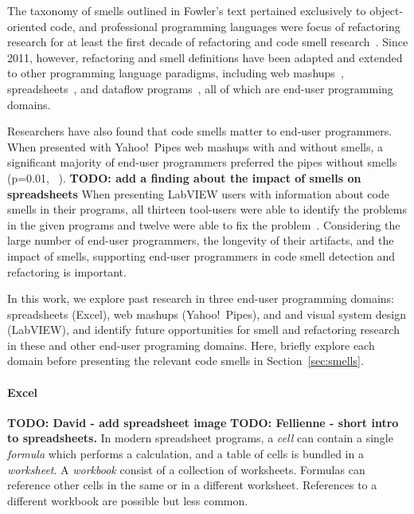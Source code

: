 \documentclass[10pt,conference,compsocconf]{IEEEtran}
\newcommand{\todo}[1]{\textbf{TODO: #1}}
\begin{document}
The taxonomy of smells outlined in Fowler's text pertained exclusively to object-oriented code, and professional programming languages were focus of refactoring research for at least the first decade of refactoring and code smell research~\cite{Mens:2004:SSR:972215.972286}.  Since 2011, however, refactoring and smell definitions have been adapted and extended to other 
programming language paradigms, including web mashups~\cite{Stolee2011, StoleeTSE2013}, spreadsheets~\cite{Hermans2011, Hermans2012inter, hermans2014bumblebee}, and dataflow programs~\cite{chambers2013smell}, all of which are  end-user programming domains. 

Researchers have also found that code smells matter to end-user programmers. When presented with Yahoo!\ Pipes web mashups with and without smells, a significant majority of end-user programmers preferred the pipes without smells (p=0.01, ~\cite{StoleeTSE2013}). 
\todo{add a finding about the impact of smells on spreadsheets} 
When presenting LabVIEW users with information about code smells in their programs, all thirteen tool-users were able to identify the problems in the given programs and twelve were able to fix the problem~\cite{chambers2013smell}.
Considering the large number of end-user programmers, the longevity of their artifacts, and the impact of smells, supporting end-user programmers in code smell detection and refactoring is important. 

In this work, we explore past research in three end-user programming domains: spreadsheets (Excel), web mashups (Yahoo!\ Pipes), and and visual system design (LabVIEW), and identify future opportunities for smell and refactoring research in these and other end-user programing domains. Here, briefly explore each domain  before presenting the relevant code smells in  Section~\ref{sec:smells}.

\paragraph{Excel}
\todo{David - add spreadsheet image}
\todo{Fellienne - short intro to spreadsheets.}
In modern spreadsheet programs, a \textit{cell} can contain a single \textit{formula} which performs a calculation, and a table of cells is bundled in a \textit{worksheet}.
A \textit{workbook} consist of a collection of worksheets.
Formulas can reference other cells in the same or in a different worksheet.
References to a different workbook are possible but less common.
\end{document}
